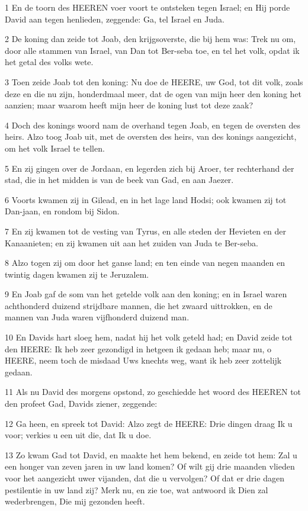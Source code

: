 \par 1 En de toorn des HEEREN voer voort te ontsteken tegen Israel; en Hij porde David aan tegen henlieden, zeggende: Ga, tel Israel en Juda.
\par 2 De koning dan zeide tot Joab, den krijgsoverste, die bij hem was: Trek nu om, door alle stammen van Israel, van Dan tot Ber-seba toe, en tel het volk, opdat ik het getal des volks wete.
\par 3 Toen zeide Joab tot den koning: Nu doe de HEERE, uw God, tot dit volk, zoals deze en die nu zijn, honderdmaal meer, dat de ogen van mijn heer den koning het aanzien; maar waarom heeft mijn heer de koning lust tot deze zaak?
\par 4 Doch des konings woord nam de overhand tegen Joab, en tegen de oversten des heirs. Alzo toog Joab uit, met de oversten des heirs, van des konings aangezicht, om het volk Israel te tellen.
\par 5 En zij gingen over de Jordaan, en legerden zich bij Aroer, ter rechterhand der stad, die in het midden is van de beek van Gad, en aan Jaezer.
\par 6 Voorts kwamen zij in Gilead, en in het lage land Hodsi; ook kwamen zij tot Dan-jaan, en rondom bij Sidon.
\par 7 En zij kwamen tot de vesting van Tyrus, en alle steden der Hevieten en der Kanaanieten; en zij kwamen uit aan het zuiden van Juda te Ber-seba.
\par 8 Alzo togen zij om door het ganse land; en ten einde van negen maanden en twintig dagen kwamen zij te Jeruzalem.
\par 9 En Joab gaf de som van het getelde volk aan den koning; en in Israel waren achthonderd duizend strijdbare mannen, die het zwaard uittrokken, en de mannen van Juda waren vijfhonderd duizend man.
\par 10 En Davids hart sloeg hem, nadat hij het volk geteld had; en David zeide tot den HEERE: Ik heb zeer gezondigd in hetgeen ik gedaan heb; maar nu, o HEERE, neem toch de misdaad Uws knechts weg, want ik heb zeer zottelijk gedaan.
\par 11 Als nu David des morgens opstond, zo geschiedde het woord des HEEREN tot den profeet Gad, Davids ziener, zeggende:
\par 12 Ga heen, en spreek tot David: Alzo zegt de HEERE: Drie dingen draag Ik u voor; verkies u een uit die, dat Ik u doe.
\par 13 Zo kwam Gad tot David, en maakte het hem bekend, en zeide tot hem: Zal u een honger van zeven jaren in uw land komen? Of wilt gij drie maanden vlieden voor het aangezicht uwer vijanden, dat die u vervolgen? Of dat er drie dagen pestilentie in uw land zij? Merk nu, en zie toe, wat antwoord ik Dien zal wederbrengen, Die mij gezonden heeft.
